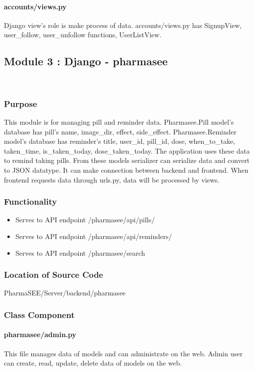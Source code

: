 \documentclass[conference]{IEEEtran}
\begin{document}
\paragraph{accounts/views.py}
Django view's role is make process of data. accounts/views.py has SignupView, user\_follow, user\_unfollow functions, UserListView. 


\subsection{Module 3 : Django - pharmasee}\\
\subsubsection{Purpose}This module is for managing pill and reminder data. Pharmasee.Pill model's database has pill's name, image\_dir, effect, side\_effect. Pharmasee.Reminder model's database has reminder's title, user\_id, pill\_id, dose, when\_to\_take, taken\_time, is\_taken\_today, dose\_taken\_today. The application uses these data to remind taking pills. From these models serializer can serialize data and convert to JSON datatype. It can make connection between backend and frontend. When frontend requests data through urls.py, data will be processed by views.
\subsubsection{Functionality}
\begin{itemize}
    \item Serves to API endpoint /pharmasee/api/pills/
    \item Serves to API endpoint /pharmasee/api/reminders/
    \item Serves to API endpoint /pharmasee/search
\end{itemize}
\bigskip
\subsubsection{Location of Source Code} PharmaSEE/Server/backend/pharmasee
\subsubsection{Class Component}

\paragraph{pharmasee/admin.py}
This file manages data of models and can administrate on the web. Admin user can create, read, update, delete data of models on the web. 
\end{document}
